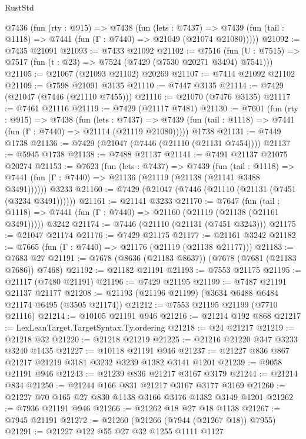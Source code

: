 \begin{lexlean}{RustStd}
\begin{coremodule}
  @7436
    (fun (rty : @915) =>
    @7438
      (fun (lets : @7437) =>
      @7439 (fun (tail : @1118) => @7441 (fun (Γ : @7440) => @21049 (@21074 @21080)))))
@21092 := @7435 @21091
@21093 := @7433 @21092
@21102 := @7516
    (fun (U : @7515) => @7517 (fun (t : @23) => @7524 (@7429 (@7530 @20271 @3494) @7541)))
@21105 := @21067 (@21093 @21102) @20269
@21107 := @7414 @21092 @21102
@21109 := @7598 @21091 @3135
@21110 := @7447 @3135
@21114 := @7429 (@21047 (@7446 (@21110 @7455)))
@21116 := @21070 (@7476 @3135)
@21117 := @7461 @21116
@21119 := @7429 (@21117 @7481)
@21130 := @7601
    (fun (rty : @915) =>
    @7438
      (fun (lets : @7437) =>
      @7439 (fun (tail : @1118) => @7441 (fun (Γ : @7440) => @21114 (@21119 @21080)))))
    @1738
@21131 := @7449 @1738
@21136 := @7429 (@21047 (@7446 (@21110 (@21131 @7454))))
@21137 := @5945 @1738
@21138 := @7488 @21137
@21141 := @7491 @21137 @21075 @20274
@21153 := @7623
    (fun (lets : @7437) =>
    @7439
      (fun (tail : @1118) =>
      @7441 (fun (Γ : @7440) => @21136 (@21119 (@21138 (@21141 @3488 @3491))))))
    @3233
@21160 := @7429 (@21047 (@7446 (@21110 (@21131 (@7451 (@3234 @3491))))))
@21161 := @21141 @3233
@21170 := @7647
    (fun (tail : @1118) => @7441 (fun (Γ : @7440) => @21160 (@21119 (@21138 (@21161 @3491)))))
    @3242
@21174 := @7446 (@21110 (@21131 (@7451 @3243)))
@21175 := @21047 @21174
@21176 := @7429 @21175
@21177 := @21161 @3242
@21182 := @7665 (fun (Γ : @7440) => @21176 (@21119 (@21138 @21177)))
@21183 := @7683 @27
@21191 := @7678 (@8636 (@21183 @8637)) (@7678 (@7681 (@21183 @7686)) @7468)
@21192 := @21182 @21191
@21193 := @7553 @21175
@21195 := @21117 (@7480 @21191)
@21196 := @7429 @21195
@21199 := @7487 @21191 @21137 @21177
@21208 := @21193 (@21196 @21199) (@3634 @6488 @6484 @21174 @6495 (@3505 @21174))
@21212 := @7553 @21195 @21199 (@7710 @21116)
@21214 := @10105 @21191 @946
@21216 := @21214 @192 @868
@21217 := LexLeanTarget.TargetSyntax.Ty.ordering
@21218 := @24 @21217
@21219 := @21218 @32
@21220 := @21218 @21219
@21225 := @21216 @21220 @347 @3233 @3240 @1435
@21227 := @10118 @21191 @946
@21237 := @21227 @836 @867 @21217 @21219 @3181 @3232 @3239 @1382 @3141 @1201
@21239 := @9058 @21191 @946
@21243 := @21239 @836 @21217 @3167 @3179
@21244 := @21214 @834
@21250 := @21244 @166 @831 @21217 @3167 @3177 @3169
@21260 := @21227 @70 @165 @27 @830 @1138 @3166 @3176 @1382 @3149 @1201
@21262 := @7936 @21191 @946
@21266 := @21262 @18 @27 @18 @1138
@21267 := @7945 @21191
@21272 := @21260 (@21266 (@7944 (@21267 @18)) @7955)
@21291 := @21227
    @122
    @55
    @27
    @32
    @1255
    @1111
    @1127

\end{coremodule}
\end{lexlean}
